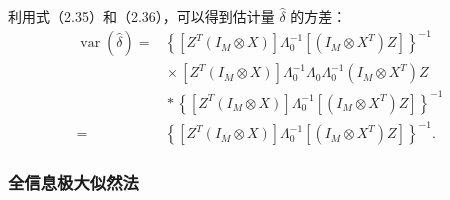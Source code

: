 利用式（2.35）和（2.36），可以得到估计量 $\widehat\delta$ 的方差：
\begin{equation}
\begin{aligned}
\operatorname{var}(\widehat\delta)
={}&\left\{[Z^T(I_M\otimes X)]\Lambda_0^{-1}[(I_M\otimes X^T)Z]\right\}^{-1}\\
&{}\times[Z^T(I_M\otimes X)]\Lambda_0^{-1}\Lambda_0\Lambda_0^{-1}
(I_M\otimes X^T)Z\\
&{}\ast\left\{[Z^T(I_M\otimes X)]\Lambda_0^{-1}[(I_M\otimes X^T)Z]\right\}^{-1}\\
={}&\left\{[Z^T(I_M\otimes X)]\Lambda_0^{-1}[(I_M\otimes X^T)Z]\right\}^{-1}.
\end{aligned}\tag{2.37}
\end{equation}

\subsubsection{全信息极大似然法}


